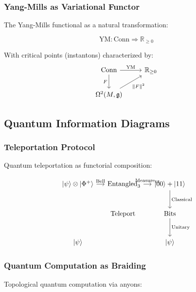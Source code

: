 \subsubsection{Yang-Mills as Variational Functor}

The Yang-Mills functional as a natural transformation:

\[
\text{YM}: \text{Conn} \Rightarrow \mathbb{R}_{\geq 0}
\]

With critical points (instantons) characterized by:
\[
\begin{tikzcd}
\text{Conn} \arrow[r, "\text{YM}"] \arrow[d, "F"'] & 
\mathbb{R}_{\geq 0} \\
\Omega^2(M, \mathfrak{g}) \arrow[ur, "\|F\|^2"'] &
\end{tikzcd}
\]

\subsection{Quantum Information Diagrams}

\subsubsection{Teleportation Protocol}

Quantum teleportation as functorial composition:

\[
\begin{tikzcd}[column sep=small, row sep=large]
\vert\psi\rangle \otimes \vert\Phi^+\rangle \arrow[r, "\text{Bell}"] & 
\text{Entangled}_3 \arrow[r, "\text{Measure}_{12}"] & 
\vert 00\rangle + \vert 11\rangle \arrow[d, "\text{Classical}"] \\
& & 
\text{Bits} \arrow[d, "\text{Unitary}"] \\
\vert\psi\rangle \arrow[uurr, phantom, "\text{Teleport}"] & & 
\vert\psi\rangle
\end{tikzcd}
\]

\subsubsection{Quantum Computation as Braiding}

Topological quantum computation via anyons:

\begin{center}
\end{center}

